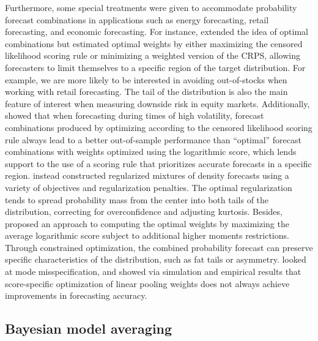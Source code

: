\documentclass[a4paper,11pt]{article}
\begin{document}
Furthermore, some special treatments were given to accommodate probability forecast combinations in applications such as energy forecasting, retail forecasting, and economic forecasting. For instance, \citet{Opschoor2017-yu} extended the idea of optimal combinations but estimated optimal weights by either maximizing the censored likelihood scoring rule \citep{Diks2011-gj} or minimizing a weighted version of the CRPS, allowing forecasters to limit themselves to a specific region of the target distribution. For example, we are more likely to be interested in avoiding out-of-stocks when working with retail forecasting. The tail of the distribution is also the main feature of interest when measuring downside risk in equity markets. Additionally, \citet{Zischke2022-sv} showed that when forecasting during times of high volatility, forecast combinations produced by optimizing according to the censored likelihood scoring rule always lead to a better out-of-sample performance than ``optimal'' forecast combinations with weights optimized using the logarithmic score, which lends support to the use of a scoring rule that prioritizes accurate forecasts in a specific region. \citet{Diebold2022-rm} instead constructed regularized mixtures of density forecasts using a variety of objectives and regularization penalties. The optimal regularization tends to spread probability mass from the center into both tails of the distribution, correcting for overconfidence and adjusting kurtosis. Besides, \citet{Pauwels2020-zl} proposed an approach to computing the optimal weights by maximizing the average logarithmic score subject to additional higher moments restrictions. Through constrained optimization, the combined probability forecast can preserve specific characteristics of the distribution, such as fat tails or asymmetry. \citet{Martin2021-yi} looked at mode misspecification, and showed via simulation and empirical results that score-specific optimization of linear pooling weights does not always achieve improvements in forecasting accuracy.

\subsection{Bayesian model averaging}
\label{sec:bma}
\end{document}
